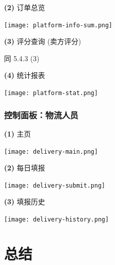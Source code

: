 \documentclass[12pt]{article}
\begin{document}
\noindent \textbf{(2)} 订单总览
\begin{center}
	\texttt{[image: platform-info-sum.png]}
\end{center}

\noindent \textbf{(3)} 评分查询 (卖方评分)

同 5.4.3 (3)

\noindent \textbf{(4)} 统计报表
\begin{center}
	\texttt{[image: platform-stat.png]}
\end{center}

\subsubsection{控制面板：物流人员}
\noindent \textbf{(1)} 主页
\begin{center}
	\texttt{[image: delivery-main.png]}
\end{center}

\noindent \textbf{(2)} 每日填报
\begin{center}
	\texttt{[image: delivery-submit.png]}
\end{center}

\noindent \textbf{(3)} 填报历史
\begin{center}
	\texttt{[image: delivery-history.png]}
\end{center}

\section{总结}
\end{document}
